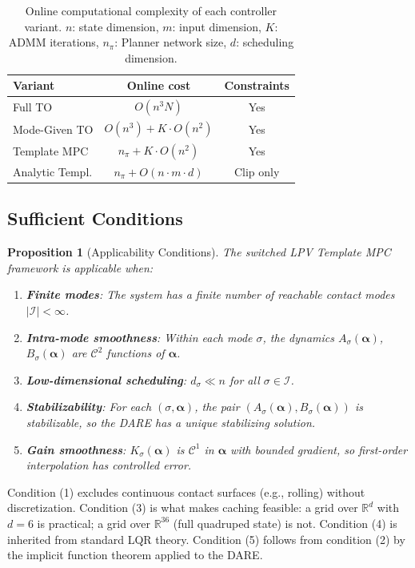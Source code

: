 \documentclass[letterpaper, 10pt, conference]{IEEEtran}
\newtheorem{proposition}{Proposition}
\newcommand{\R}{\mathbb{R}}
\newcommand{\balpha}{\bm{\alpha}}
\newcommand{\cI}{\mathcal{I}}
\begin{document}
\begin{table}[t]
\centering
\caption{Online computational complexity of each controller variant.
  $n$: state dimension, $m$: input dimension, $K$: ADMM iterations,
  $n_\pi$: Planner network size, $d$: scheduling dimension.}
\label{tab:complexity}
\begin{tabular}{@{}lcc@{}}
\toprule
Variant & Online cost & Constraints \\
\midrule
Full TO         & $O(n^3 N)$     & Yes \\
Mode-Given TO   & $O(n^3) + K \cdot O(n^2)$ & Yes \\
Template MPC    & $n_\pi + K \cdot O(n^2)$ & Yes \\
Analytic Templ. & $n_\pi + O(n \cdot m \cdot d)$ & Clip only \\
\bottomrule
\end{tabular}
\end{table}

\subsection{Sufficient Conditions}

\begin{proposition}[Applicability Conditions]
\label{prop:conditions}
The switched LPV Template MPC framework is applicable when:
\begin{enumerate}
  \item \textbf{Finite modes}: The system has a finite number
    of reachable contact modes $|\cI| < \infty$.
  \item \textbf{Intra-mode smoothness}: Within each mode $\sigma$,
    the dynamics $A_\sigma(\balpha)$, $B_\sigma(\balpha)$
    are $\mathcal{C}^2$ functions of $\balpha$.
  \item \textbf{Low-dimensional scheduling}:
    $d_\sigma \ll n$ for all $\sigma \in \cI$.
  \item \textbf{Stabilizability}: For each $(\sigma, \balpha)$,
    the pair $(A_\sigma(\balpha), B_\sigma(\balpha))$
    is stabilizable, so the DARE has a unique
    stabilizing solution.
  \item \textbf{Gain smoothness}: $K_\sigma(\balpha)$
    is $\mathcal{C}^1$ in $\balpha$ with bounded gradient,
    so first-order interpolation has controlled error.
\end{enumerate}
\end{proposition}

Condition (1) excludes continuous contact surfaces
(e.g., rolling) without discretization.
Condition (3) is what makes caching feasible:
a grid over $\R^d$ with $d = 6$ is practical;
a grid over $\R^{36}$ (full quadruped state) is not.
Condition (4) is inherited from standard LQR theory.
Condition (5) follows from condition (2) by the implicit
function theorem applied to the DARE.
\end{document}
